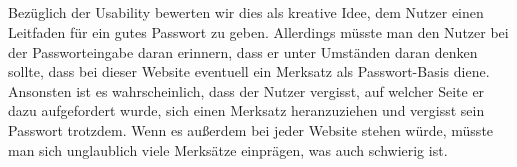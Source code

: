 \subsection{}
Bezüglich der Usability bewerten wir dies als kreative Idee, dem Nutzer einen Leitfaden für ein gutes Passwort zu geben. Allerdings müsste man den Nutzer bei der Passworteingabe daran erinnern, dass er unter Umständen daran denken sollte, dass bei dieser Website eventuell ein Merksatz als Passwort-Basis diene. Ansonsten ist es wahrscheinlich, dass der Nutzer vergisst, auf welcher Seite er dazu aufgefordert wurde, sich einen Merksatz heranzuziehen und vergisst sein Passwort trotzdem. Wenn es außerdem bei jeder Website stehen würde, müsste man sich unglaublich viele Merksätze einprägen, was auch schwierig ist. 

